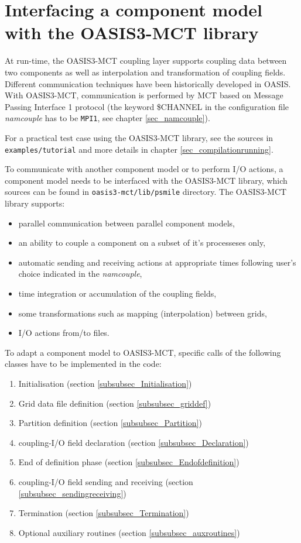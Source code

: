 \newpage
\chapter{Interfacing a component model with the OASIS3-MCT library}
\label{sec_modelinterfacing}

At run-time, the OASIS3-MCT coupling layer supports coupling data
between two components as well as interpolation and transformation
of coupling fields. Different communication techniques have been historically
developed in OASIS. With OASIS3-MCT, communication is performed by MCT based on Message Passing Interface 1 protocol (the keyword \$CHANNEL in the configuration file {\it namcouple} has to be {\tt MPI1}, see chapter \ref{sec_namcouple}). 

For a practical test case using the OASIS3-MCT library, see the sources in
{\tt examples/tutorial} and more details in chapter \ref{sec_compilationrunning}.

To communicate with another component model or to perform I/O actions, a component model needs to be interfaced with the OASIS3-MCT library, which sources can be found in {\tt oasis3-mct/lib/psmile} directory. The OASIS3-MCT library supports:

\begin{itemize}
\item parallel communication between parallel component models,
\item an ability to couple a component on a subset of it's processeses only,
\item automatic sending and receiving actions at appropriate times
 following user's choice indicated in the {\it namcouple},
\item time integration or accumulation of the coupling fields,
\item some transformations such as mapping (interpolation) between grids,
\item I/O actions from/to files.
\end{itemize}

To adapt a component model to OASIS3-MCT, specific calls of
 the following classes have to be implemented in the code:

\begin{enumerate}
\item Initialisation (section \ref{subsubsec_Initialisation})
\item Grid data file definition (section \ref{subsubsec_griddef})
\item Partition definition (section \ref{subsubsec_Partition})
\item coupling-I/O field declaration (section \ref{subsubsec_Declaration})
\item End of definition phase (section \ref{subsubsec_Endofdefinition})
\item coupling-I/O field sending and receiving (section
\ref{subsubsec_sendingreceiving})
\item Termination (section \ref{subsubsec_Termination})
\item Optional auxiliary routines (section \ref{subsubsec_auxroutines})
\end{enumerate}

